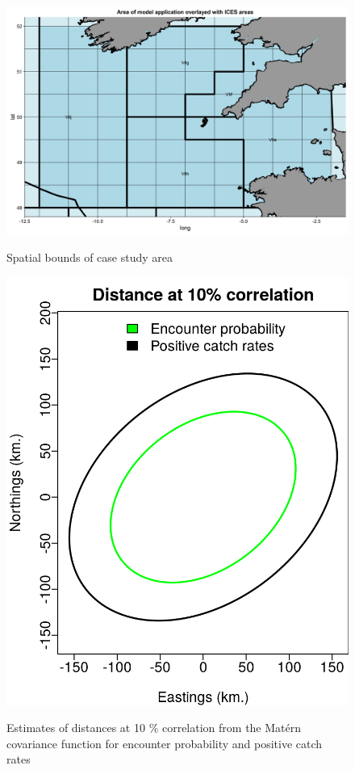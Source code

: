 \documentclass[12pt]{article}
\begin{document}
\begin{linenumbers}
\begin{figure}[!ht]
\begin{center}
	\includegraphics[width = 0.9\linewidth]{"../figures/AreaMap"}
	\label{fig:S9}
	\caption{Spatial bounds of case study area}
	\end{center}
\end{figure}

\begin{figure}[!ht]
\begin{center}
	\includegraphics[width = 0.9\linewidth]{"../figures/Aniso"}
	\label{fig:S10}
	\caption{Estimates of distances at 10 \% correlation from the Matérn
		covariance function for encounter probability and positive
		catch rates}
	\end{center}
\end{figure}



\end{linenumbers}
\end{document}
